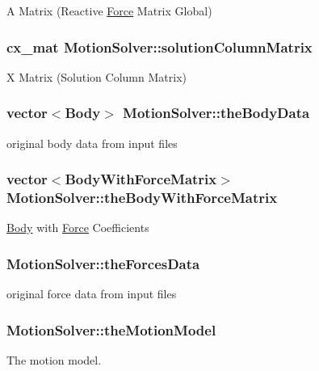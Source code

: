A Matrix (Reactive \hyperlink{class_force}{Force} Matrix Global) \hypertarget{class_motion_solver_aba617c457e3dab115693c4b3a23f9827}{
\subsubsection[{solution\-Column\-Matrix}]{\setlength{\rightskip}{0pt plus 5cm}cx\-\_\-mat Motion\-Solver\-::solution\-Column\-Matrix}}\label{class_motion_solver_aba617c457e3dab115693c4b3a23f9827}
X Matrix (Solution Column Matrix) \hypertarget{class_motion_solver_aa706c345b20614a18e9f8f59c6174d2a}{
\subsubsection[{the\-Body\-Data}]{\setlength{\rightskip}{0pt plus 5cm}vector$<${\bf Body}$>$ Motion\-Solver\-::the\-Body\-Data}}\label{class_motion_solver_aa706c345b20614a18e9f8f59c6174d2a}
original body data from input files \hypertarget{class_motion_solver_ac6c73cbeb23091b0064a9a2d0cd0752c}{
\subsubsection[{the\-Body\-With\-Force\-Matrix}]{\setlength{\rightskip}{0pt plus 5cm}vector$<${\bf Body\-With\-Force\-Matrix}$>$ Motion\-Solver\-::the\-Body\-With\-Force\-Matrix}}\label{class_motion_solver_ac6c73cbeb23091b0064a9a2d0cd0752c}
\hyperlink{class_body}{Body} with \hyperlink{class_force}{Force} Coefficients \hypertarget{class_motion_solver_a9c8dd3a151361ae664c9ff4e9958f649}{
\subsubsection[{the\-Forces\-Data}]{ Motion\-Solver\-::the\-Forces\-Data}}\label{class_motion_solver_a9c8dd3a151361ae664c9ff4e9958f649}
original force data from input files \hypertarget{class_motion_solver_a19e40f754e74afd9f99a3944360165bf}{
\subsubsection[{the\-Motion\-Model}]{ Motion\-Solver\-::the\-Motion\-Model}}\label{class_motion_solver_a19e40f754e74afd9f99a3944360165bf}
The motion model. 


